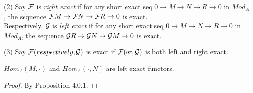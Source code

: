 \documentclass[11pt,fleqn]{book} %
\begin{document}
\begin{CJK}{UTF8}{gkai}
\begin{definition}
	(2) Say $\mathcal{F}$ is {\it right exact} if for any short exact seq $0\to M\to N\to R \to 0$ in $Mod_A$, the sequence $\mathcal{F} M\to \mathcal{F} N \to \mathcal{F} R\to 0$ is exact. \\
	Respectively, $\mathcal{G}$ is {\it left exact} if for any short exact seq $0\to M\to N\to R \to 0$ in $Mod_A$, the sequence $\mathcal{G} R\to \mathcal{G} N \to \mathcal{G} M\to 0$ is exact.

	(3) Say $\mathcal{F} (respectively, \mathcal{G})$ is exact if $\mathcal{F} (or, \mathcal{G})$ is both left and right exact. 
\end{definition}

\begin{proposition}
	$Hom_A(M,\cdot)$ and $Hom_A(\cdot, N)$ are left exact functors.	
\end{proposition}
\begin{proof}
	By Proposition 4.0.1.
\end{proof}

\
\end{CJK}
\end{document}
